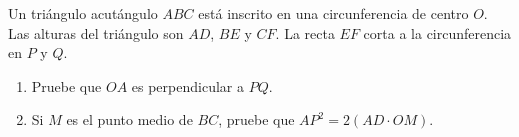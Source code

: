 Un triángulo acutángulo $ABC$ está inscrito en una circunferencia de centro $O$. \newline 
Las alturas del triángulo son $AD$, $BE$ y $CF$. La recta $EF$ corta a la circunferencia en $P$ y $Q$.
 \begin{enumerate} 
   \item Pruebe que $OA$ es perpendicular a $PQ$.
   \item Si $M$ es el punto medio de $BC$, pruebe que $AP^2 = 2(AD \cdot OM)$.
 \end{enumerate} 
